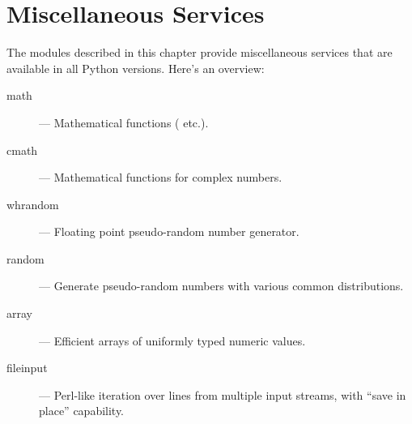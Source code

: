 \chapter{Miscellaneous Services}
\label{misc}

The modules described in this chapter provide miscellaneous services
that are available in all Python versions.  Here's an overview:

\begin{description}

\item[math]
--- Mathematical functions ( etc.).

\item[cmath]
--- Mathematical functions for complex numbers.

\item[whrandom]
--- Floating point pseudo-random number generator.

\item[random]
--- Generate pseudo-random numbers with various common distributions.

\item[array]
--- Efficient arrays of uniformly typed numeric values.

\item[fileinput]
--- Perl-like iteration over lines from multiple input streams, with
``save in place'' capability.

\end{description}
